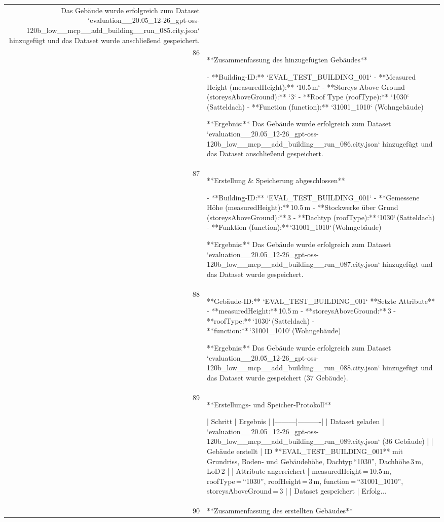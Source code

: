 \documentclass[a4paper,11pt]{article}
\begin{document}
\begin{table}[ht]
\begin{tabular}{r p{12cm}}
Das Gebäude wurde erfolgreich zum Dataset `evaluation\_\_20.05\_12-26\_gpt-oss-120b\_low\_\_mcp\_\_add\_building\_\_run\_085.city.json` hinzugefügt und das Dataset wurde anschließend gespeichert. \\
86 & **Zusammenfassung des hinzugefügten Gebäudes**

- **Building-ID:** `EVAL\_TEST\_BUILDING\_001`  
- **Measured Height (measuredHeight):** `10.5 m`  
- **Storeys Above Ground (storeysAboveGround):** `3`  
- **Roof Type (roofType):** `1030` (Satteldach)  
- **Function (function):** `31001\_1010` (Wohngebäude)  

**Ergebnis:**  
Das Gebäude wurde erfolgreich zum Dataset `evaluation\_\_20.05\_12-26\_gpt-oss-120b\_low\_\_mcp\_\_add\_building\_\_run\_086.city.json` hinzugefügt und das Dataset anschließend gespeichert. \\
87 & **Erstellung \& Speicherung abgeschlossen**

- **Building‑ID:** `EVAL\_TEST\_BUILDING\_001`  
- **Gemessene Höhe (measuredHeight):** 10.5 m  
- **Stockwerke über Grund (storeysAboveGround):** 3  
- **Dachtyp (roofType):** `1030` (Satteldach)  
- **Funktion (function):** `31001\_1010` (Wohngebäude)  

**Ergebnis:** Das Gebäude wurde erfolgreich zum Dataset `evaluation\_\_20.05\_12-26\_gpt-oss-120b\_low\_\_mcp\_\_add\_building\_\_run\_087.city.json` hinzugefügt und das Dataset wurde gespeichert. \\
88 & **Gebäude‑ID:** `EVAL\_TEST\_BUILDING\_001`  
**Setzte Attribute**  
- **measuredHeight:** 10.5 m  
- **storeysAboveGround:** 3  
- **roofType:** `1030` (Satteldach)  
- **function:** `31001\_1010` (Wohngebäude)  

**Ergebnis:** Das Gebäude wurde erfolgreich zum Dataset `evaluation\_\_20.05\_12-26\_gpt-oss-120b\_low\_\_mcp\_\_add\_building\_\_run\_088.city.json` hinzugefügt und das Dataset wurde gespeichert (37 Gebäude). \\
89 & **Erstellungs‑ und Speicher‑Protokoll**

| Schritt | Ergebnis |
|---------|----------|
| Dataset geladen | `evaluation\_\_20.05\_12-26\_gpt-oss-120b\_low\_\_mcp\_\_add\_building\_\_run\_089.city.json` (36 Gebäude) |
| Gebäude erstellt | ID **EVAL\_TEST\_BUILDING\_001** mit Grundriss, Boden‑ und Gebäudehöhe, Dachtyp “1030”, Dachhöhe 3 m, LoD 2 |
| Attribute angereichert | measuredHeight = 10.5 m, roofType = “1030”, roofHeight = 3 m, function = “31001\_1010”, storeysAboveGround = 3 |
| Dataset gespeichert | Erfolg... \\
90 & **Zusammenfassung des erstellten Gebäudes**


\end{tabular}
\end{table}
\end{document}
